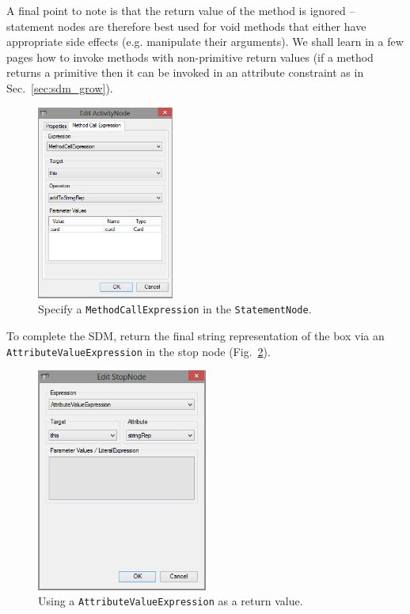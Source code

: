 A final point to note is that the
return value of the method is ignored -- statement nodes are therefore best used
for void methods that either have appropriate side effects (e.g. manipulate
their arguments).  We shall learn in a few pages how to invoke
methods with non-primitive return values (if a method returns a primitive then it can be
invoked in an attribute constraint as in Sec.~\ref{sec:sdm_grow}).

\begin{figure}[htbp]
\begin{center}
  \includegraphics[width=0.4\textwidth]{pics/sdmBilder/toString/sdm74.png}
  \caption{Specify a \texttt{MethodCallExpression} in the
  \texttt{StatementNode}.}
  \label{fig:sdm_tostring_3}
\end{center}
\end{figure}

To complete the SDM, return the final string representation of the box via an \texttt{AttributeValueExpression} in the stop node
(Fig.~\ref{fig:sdm_tostring_4}). 

\begin{figure}[htbp]
\begin{center}
  \includegraphics[width=0.5\textwidth]{pics/sdmBilder/toString/sdm75.png}
  \caption{Using a \texttt{AttributeValueExpression} as a return value.}  
  \label{fig:sdm_tostring_4}
\end{center}
\end{figure}

